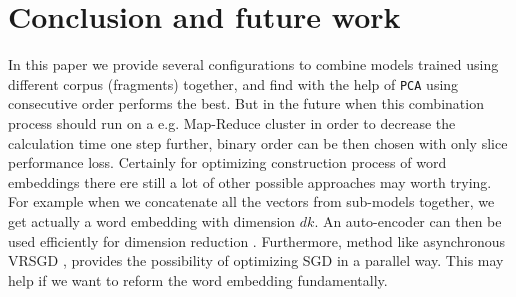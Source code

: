 \section{Conclusion and future work}
In this paper we provide several configurations to combine models trained using different corpus (fragments) together, and find with the help of \verb|PCA| using consecutive order performs the best. But in the future when this combination process should run on a e.g. Map-Reduce cluster in order to decrease the calculation time one step further, binary order can be then chosen with only slice performance loss. Certainly for optimizing construction process of word embeddings there ere still a lot of other possible approaches may worth trying. For example when we concatenate all the vectors from sub-models together, we get actually a word embedding with dimension $dk$. An auto-encoder can then be used efficiently for dimension reduction \cite{hinton2006reducing}. Furthermore, method like asynchronous VRSGD \cite{keuperasynchronous}, \cite{keuper2015asynchronous} provides the possibility of optimizing SGD in a parallel way. This may help if we want to reform the word embedding fundamentally.

